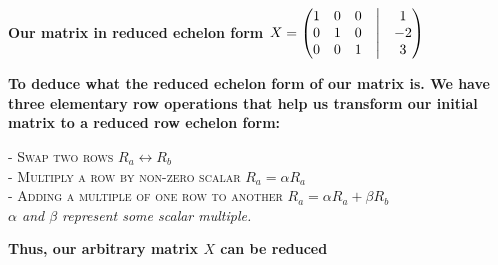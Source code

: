 \documentclass{article}
\begin{document}
	\textbf{Our matrix in reduced echelon form $ X = \begin{pmatrix}
			1 & 0 & 0 &\bigm| & 1\\
			0 & 1 & 0 &\bigm| & -2 \\
			0 & 0 & 1 &\bigm| & 3 
		\end{pmatrix}$}
	
	\textbf{To deduce what the reduced echelon form of our matrix is. We have three elementary row operations that help us transform our initial matrix to a reduced row echelon form:}
	
	\textsc{- Swap two rows $R_{{a}} \longleftrightarrow R_{{b}}$ \\ - Multiply a row by non-zero scalar $R_{{a}} = \alpha R_{{a}}$\\ - Adding a multiple of one row to another $R_{{a}} = \alpha R_{{a}} + \beta R_{{b}}$}\\
	\textit{$\alpha$ and $\beta$ represent some scalar multiple.}
	
	\textbf{Thus, our arbitrary matrix $X$ can be reduced}
	
	
	
	
\end{document}
